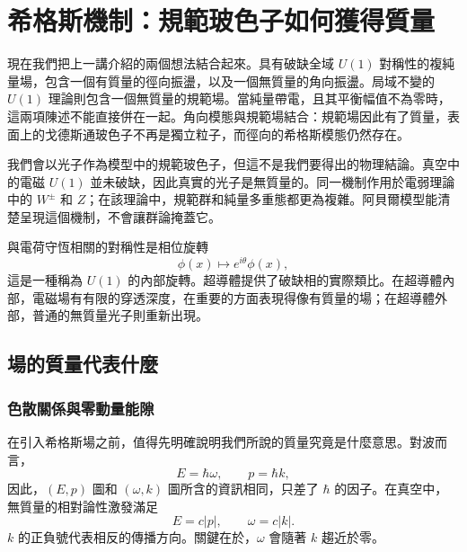 \chapter{希格斯機制：規範玻色子如何獲得質量}

現在我們把上一講介紹的兩個想法結合起來。具有破缺全域 \(U(1)\) 對稱性的複純量場，包含一個有質量的徑向振盪，以及一個無質量的角向振盪。局域不變的 \(U(1)\) 理論則包含一個無質量的規範場。當純量帶電，且其平衡幅值不為零時，這兩項陳述不能直接併在一起。角向模態與規範場結合：規範場因此有了質量，表面上的戈德斯通玻色子不再是獨立粒子，而徑向的希格斯模態仍然存在。

我們會以光子作為模型中的規範玻色子，但這不是我們要得出的物理結論。真空中的電磁 \(U(1)\) 並未破缺，因此真實的光子是無質量的。同一機制作用於電弱理論中的 \(W^\pm\) 和 \(Z\)；在該理論中，規範群和純量多重態都更為複雜。阿貝爾模型能清楚呈現這個機制，不會讓群論掩蓋它。

\begin{classroomqa}
\end{classroomqa}

與電荷守恆相關的對稱性是相位旋轉
\begin{equation}
  \phi(x)\longmapsto e^{i\theta}\phi(x),
\end{equation}
這是一種稱為 \(U(1)\) 的內部旋轉。超導體提供了破缺相的實際類比。在超導體內部，電磁場有有限的穿透深度，在重要的方面表現得像有質量的場；在超導體外部，普通的無質量光子則重新出現。

\section{場的質量代表什麼}

\subsection{色散關係與零動量能隙}

在引入希格斯場之前，值得先明確說明我們所說的質量究竟是什麼意思。對波而言，
\begin{equation}
  E=\hbar\omega,
  \qquad
  p=\hbar k,
  \label{eq:l08-quantum-wave}
\end{equation}
因此，\((E,p)\) 圖和 \((\omega,k)\) 圖所含的資訊相同，只差了 \(\hbar\) 的因子。在真空中，無質量的相對論性激發滿足
\begin{equation}
  E=c|p|,
  \qquad
  \omega=c|k|.
  \label{eq:l08-massless-dispersion}
\end{equation}
\(k\) 的正負號代表相反的傳播方向。關鍵在於，\(\omega\) 會隨著 \(k\) 趨近於零。

